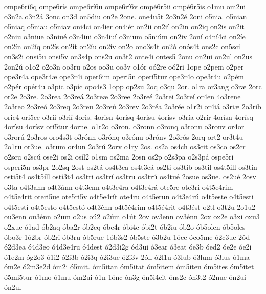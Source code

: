 {ompe6r^^ed6q
ompe6r^^eds
ompe6r^^ed6u
ompe6r^^ed6v
omp^^e96r5ii
omp^^e96r5is
o1mu
om2ui
o3n2a
o3n2^^e1
3onc
on3d
on5diu
on2e
2one.
one4u5t
2o3n2^^e9
2oni
o5nia.
o5nian
o5niaq
o5niau
o5niav
oni4ci
on4ier
on4i^^e9r
on2ii
on2i^^ed
on2in
on2iq
on2is
on2it
o2niu
o3niue
o3niu^^e9
o3n4iui
o3n4iu^^ed
o3nium
o5ni^^fam
on2iv
2on^^ed
o4n^^ed4ci
on2^^ede
on2^^edn
on2^^edq
on2^^eds
on2^^edt
on2^^edu
on2^^edv
on2o
ono3s4t
on2^^f3
on^^f3s4t
ons2c
on5sci
on3s2i
onsi5u
onsi5v
on3s4p
ons2u
on3t2
onte4i
ontes5
2onu
on2ui
on2ul
on2us
2on2^^fa
o1o2
o2o3n
oo3ru
o2os
oo3u
oo3v
o1^^f3r
o^^f32re
o^^f32ri
1ope
o2pem
o2per
ope3r4a
ope3r4^^e6
ope3r4i
oper6im
operi5n
oper^^ed5tur
ope3r4o
ope3r4u
o2p^^e9m
o2p^^e9r
op^^e9r4u
o3pic
o3p^^edc
opo4s3
1opp
op2su
2oq
o3qu
2or.
o1ra
or3ang
o3r^^e6
2orc
or2e
2o3re.
2o3rea
2o3re^^e1
2o3re^^e6
2o3ree
2o3re^^e9
2o3rei
2o3re^^ed
or4en
4o3rene
2o3reo
2o3re^^f3
2o3req
2o3reu
2o3re^^fa
2o3rev
2o3r^^e9a
2o3r^^e9e
o1r2i
or4i^^e1
o3ri^^e6
2o3rib
oric4
ori5ce
o3rii
o3ri^^ed
4oris.
4orisn
4orisq
4orisu
4orisv
o3r^^eda
o2r^^edr
4or^^edsn
4or^^edsq
4or^^edsu
4or^^edsv
or^^ed5tur
4orne.
o1r2o
o3ron.
o3ronn
o3ronq
o3ronu
o3ronv
or4or
o3ror^^fa
2o3ros
oro4s3t
o3r^^f3nn
o3r^^f3nq
o3r^^f3nu
o3r^^f3nv
2o3r^^f3s
2orq
ort2
or3t4u
2o1ru
or3ue.
o3rum
or4un
2o3r^^fa
2orv
o1ry
2os.
os2a
os4ch
os3cit
os3co
os2cr
o2scu
o2sc^^fa
ose2i
os2i
os^^edl2
o1sm
os2ma
2osn
os2p
o2s3pa
o2s3p^^e1
ospe5ri
osperi5n
os3pr
2o2sq
2ost
os2t^^e1
os4t3ea
os4t3e^^e1
os2ti
os3tib
os3til
os4t5ill
os3tin
osti5t4
os4t5^^edll
ost^^ed3t4
os3tri
os3tr^^ed
os3tru
os3tr^^fa
os4tu^^e9
2osue
os3ue.
os2u^^e9
2osv
o3ta
o4t3ann
o4t3^^e1nn
o4t3enn
o4t3e4ra
o4t3e4r^^e1
ote5re
ote3ri
o4t5e4rim
o4t5e4rit
oteri5ue
ote5ri5v
o4t5e4r^^edt
ote4ru
o4t5erun
o4t3e4r^^fa
o4t5este
o4t5esti
o4t5est^^ed
o4t5esto
o4t5est^^f3
o4t3^^e9nn
o4t5^^e94rim
o4t5^^e94rit
o4t3^^e9st
o2tl
o3t2u
2o1u2
ou3enn
ou3^^e9nn
o2um
o2us
o^^fa2
o2^^fam
o1^^fat
2ov
ov3enn
ov3^^e9nn
2ox
ox2e
o3xi
oxu3
o2xue
^^f31ad
^^f3b2aq
^^f3ba2r
^^f3b2eq
^^f3be4r
^^f3bi4c
^^f3bi2t
^^f3b2iu
^^f3b2o
^^f3b5olen
^^f3b5oles
^^f3bo3r
1^^f32br
^^f3b2ri
^^f3b3ru
^^f3b5rue
1^^f3b3s2
^^f3b5ste
^^f33b2u
1^^f3cc
^^f3co5me
^^f32c3ue
2^^f3d
^^f32d3ea
^^f34d3eo
^^f34d3e4ru
^^f34dest
^^f32d3i2g
^^f3d3ui
^^f33ear
^^f33eat
^^f3e3b
^^f3ed2
^^f3e2e
^^f3e2i
^^f31e2m
^^f3g2o3
^^f31i2
^^f32i3b
^^f32i3q
^^f32i3ue
^^f32i3v
2^^f3ll
^^f32l1u
^^f33lub
^^f33lum
^^f33lus
^^f31ma
^^f3m2e
^^f32m3e2d
^^f3m2i
^^f35mit.
^^f3m5itan
^^f3m5itat
^^f3m5item
^^f3m5iten
^^f3m5ites
^^f3m5itet
^^f35mi5tur
^^f31mo
^^f31mu
^^f3m2ui
^^f31n
1^^f3nc
^^f3n3g
^^f3n5i4cit
^^f3ns2c
^^f3n3t2
^^f32nue
^^f3n2ui
^^f3n2ul
}
